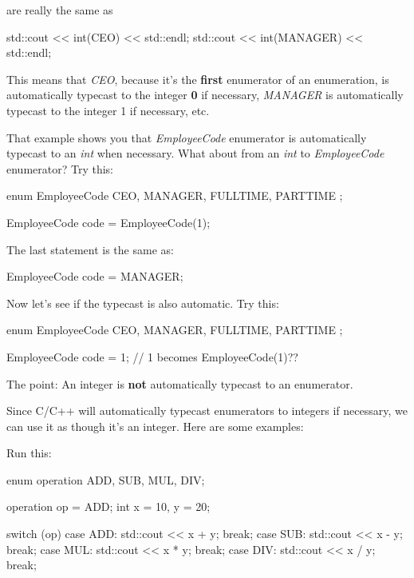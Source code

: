are really the same as

\begin{consolethree}[escapeinside=||]
std::cout << int(CEO) << std::endl;
std::cout << int(MANAGER) << std::endl;
\end{consolethree}

This means that \textit{CEO}, because it's the
\textbf{first} enumerator of an enumeration, is automatically
typecast to the integer \textbf{0} if necessary, \textit{MANAGER}
is automatically typecast to the integer 1 if necessary, etc.

That example shows you that \textit{EmployeeCode} enumerator is
automatically typecast to an \textit{int} when necessary. What about from
an \textit{int} to \textit{EmployeeCode} enumerator? Try this:

\begin{consolethree}[escapeinside=||]
enum EmployeeCode
{
    CEO, MANAGER, FULLTIME, PARTTIME
};

EmployeeCode code = EmployeeCode(1);
\end{consolethree}

The last statement is the same as:

\begin{consolethree}[escapeinside=||]
EmployeeCode code = MANAGER;
\end{consolethree}

Now let's see if the typecast is also automatic. Try this:

\begin{consolethree}[escapeinside=||]
enum EmployeeCode
{
    CEO, MANAGER, FULLTIME, PARTTIME
};

EmployeeCode code = 1; // 1 becomes EmployeeCode(1)??
\end{consolethree}

The point: An integer is \textbf{not} automatically typecast to
an enumerator.

Since C/C++ will automatically typecast enumerators to integers if
necessary, we can use it as though it's an integer. Here
are some examples:

Run this:

\begin{consolethree}[escapeinside=||]
enum operation {ADD, SUB, MUL, DIV};

operation op = ADD;
int x = 10, y = 20;

switch (op)
{
    case ADD: std::cout << x + y; break;
    case SUB: std::cout << x - y; break;
    case MUL: std::cout << x * y; break;
    case DIV: std::cout << x / y; break;
}
\end{consolethree}

